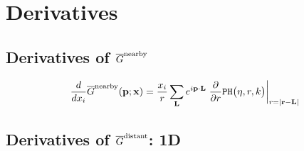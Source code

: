 \documentclass[letterpaper]{article}
\newcommand{\GB}{\overline{G}}
\begin{document}
\section{Derivatives}

\subsection{Derivatives of $\GB\sups{nearby}$}

\begin{align*}
 \frac{d}{dx_i} \GB\sups{nearby}(\vb p; \vb x)
& = \frac{x_i}{r} \sum_{\vb L} 
    e^{i \vb p \cdot \vb L}
    \left. \pard{}{r} \texttt{PH}\big(\eta, r, k\big)
    \right|_{r=|\vb r - \vb L|}
\\
\end{align*}

\subsection{Derivatives of $\GB\sups{distant}$: 1D}
\end{document}
